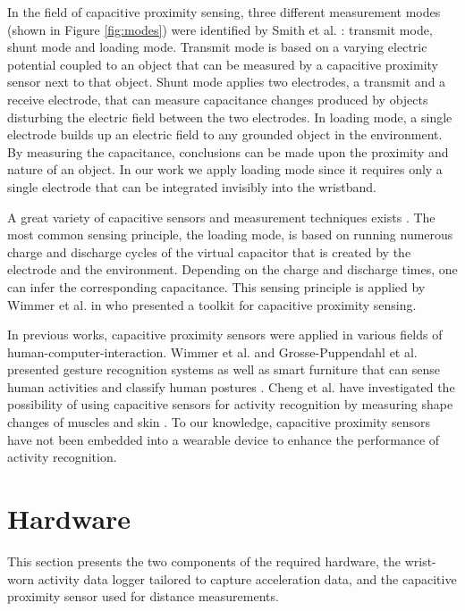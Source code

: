 \documentclass[runningheads,a4paper]{llncs}
\begin{document}
In the field of capacitive proximity sensing, three different measurement modes (shown in Figure \ref{fig:modes}) were identified by Smith et al. \cite{Smith1999}: transmit mode, shunt mode and loading mode. Transmit mode is based on a varying electric potential coupled to an object that can be measured by a capacitive proximity sensor next to that object. Shunt mode applies two electrodes, a transmit and a receive electrode, that can measure capacitance changes produced by objects disturbing the electric field between the two electrodes. In loading mode, a single electrode builds up an electric field to any grounded object in the environment. By measuring the capacitance, conclusions can be made upon the proximity and nature of an object. In our work we apply loading mode since it requires only a single electrode that can be integrated invisibly into the wristband.

A great variety of capacitive sensors and measurement techniques exists \cite{Smith1999}. The most common sensing principle, the loading mode, is based on running numerous charge and discharge cycles of the virtual capacitor that is created by the electrode and the environment. Depending on the charge and discharge times, one can infer the corresponding capacitance. This sensing principle is applied by Wimmer et al. in \cite{Wimmer2007} who presented a toolkit for capacitive proximity sensing.

In previous works, capacitive proximity sensors were applied in various fields of human-computer-interaction. Wimmer et al. and Grosse-Puppendahl et al. presented gesture recognition systems \cite{Wimmer,Grosse-puppendahl2012} as well as smart furniture that can sense human activities \cite{Wimmer} and classify human postures \cite{Grosse-puppendahl2011}. Cheng et al. have investigated the possibility of using capacitive sensors for activity recognition by measuring shape changes of muscles and skin \cite{Cheng2010}. To our knowledge, capacitive proximity sensors have not been embedded into a wearable device to enhance the performance of activity recognition.

\section{Hardware}
\label{sect:hardware}

This section presents the two components of the required hardware, the wrist-worn activity data logger tailored to capture acceleration data, and the capacitive proximity sensor used for distance measurements.
\end{document}
